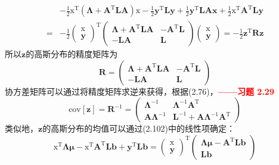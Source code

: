 \documentclass[b5paper]{book}
\numberwithin{equation}{chapter}
\newcommand {\bx} {\boldsymbol{\mathrm{x}}}
\newcommand {\rmT} {\mathrm{T}}
\newcommand {\bfMu} {\boldsymbol{\mu}}
\newcommand {\bfLambda} {\boldsymbol{\Lambda}}
\begin{document}
{\begin{equation}
\begin{split}
		&-\frac{1}{2}\bx^{\rmT}(\bfLambda + \mathbf{A}^{\rmT}\mathbf{LA})\bx-\frac{1}{2}\mathbf{y}^{\rmT}\mathbf{Ly}+\frac{1}{2}\mathbf{y}^{\rmT}\mathbf{LAx}+\frac{1}{2}\bx^{\rmT}\mathbf{A}^{\rmT}\mathbf{Ly}\\
		= &-\frac{1}{2}\left(\begin{matrix} \bx \\ \mathbf{y}\end{matrix}\right)^{\rmT}\left(\begin{matrix}\bfLambda+\mathbf{A}^{\rmT}\mathbf{LA} & -\mathbf{A}^{\rmT}\mathbf{L} \\ -\mathbf{LA} & \mathbf{L}\end{matrix}\right) \left(\begin{matrix}\bx \\ \mathbf{y}\end{matrix}\right) = -\frac{1}{2}\mathbf{z^{\rmT}Rz}
	\end{split}
	\end{equation}
	所以$\mathbf{z}$的高斯分布的精度矩阵为
	\begin{equation}
		\mathbf{R}=\left(\begin{matrix}\bfLambda + \mathbf{A}^{\rmT}\mathbf{LA} & -\mathbf{A}^{\rmT}\mathbf{L} \\ -\mathbf{LA} & \mathbf{L}\end{matrix}\right)
	\end{equation}
	协方差矩阵可以通过将精度矩阵求逆来获得，根据(2.76)，\textcolor{red}{\textbf{——习题 2.29}}
	\begin{equation}
		\mathrm{cov}[\mathbf{z}]=\mathbf{R}^{-1}=\left(\begin{matrix}
		 \bfLambda^{-1} & \bfLambda^{-1}\mathbf{A}^{\rmT} \\ 
		 \mathbf{A}\bfLambda^{-1} & \mathbf{L}^{-1}+\mathbf{A}\bfLambda^{-1} \mathbf{A}^{\rmT}
		 \end{matrix}\right)
	\end{equation}
	\indent 类似地，$\mathbf{z}$的高斯分布的均值可以通过(2.102)中的线性项确定：
	\begin{equation}
		\bx^{\rmT}\bfLambda\bfMu-\bx^{\rmT}\mathbf{A}^{\rmT}\mathbf{Lb}+\mathbf{y}^{\rmT}\mathbf{Lb}=\left(\begin{matrix}
			\bx \\ \mathbf{y}
		\end{matrix}\right)^{\rmT} 
		\left(\begin{matrix}
			\bfLambda\bfMu-\mathbf{A}^{\rmT}\mathbf{Lb} \\
			\mathbf{Lb}
		\end{matrix}\right)

\end{equation}}
\end{document}
